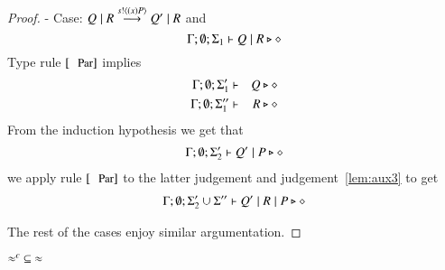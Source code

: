 \begin{proof}
	\noi - Case: $Q \;|\; R \stackrel{s ! \langle (x) P \rangle}{\longrightarrow} Q' \;|\; R$ and
	\[
		\Gamma; \emptyset; \Sigma_1 \vdash Q \;|\; R \triangleright \diamond
	\]
	\noi Type rule $\trule{Par}$ implies
	\begin{eqnarray}
		\Gamma; \emptyset; \Sigma_1' &\vdash& Q \triangleright \diamond\\
		\Gamma; \emptyset; \Sigma_1'' &\vdash& R \triangleright \diamond \label{lem:aux3}
	\end{eqnarray}
	\noi From the induction hypothesis we get that 
	\begin{eqnarray*}
		\Gamma; \emptyset; \Sigma_2' \vdash Q' \;|\; P \triangleright \diamond
	\end{eqnarray*}
	we apply rule $\trule{Par}$ to the latter judgement and judgement~\ref{lem:aux3} to get
	\begin{eqnarray*}
		\Gamma; \emptyset; \Sigma_2' \cup \Sigma'' \vdash Q' \;|\; R \;|\; P \triangleright \diamond
	\end{eqnarray*}

	The rest of the cases enjoy similar argumentation.
\end{proof}



\begin{lemma}\rm
	\label{lem:wbc_is_wb}
	$\approx^{c}\ \subseteq\ \approx$
\end{lemma}

